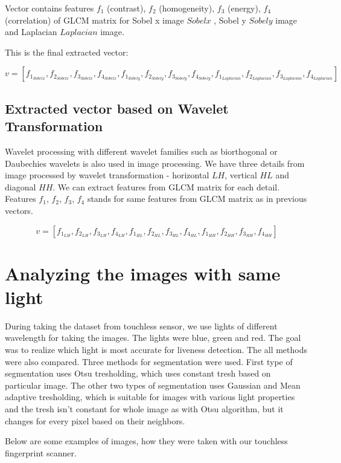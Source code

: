\documentclass{article}
\begin{document}
Vector contains features $f_1$ (contrast), $f_2$ (homogeneity), $f_3$ (energy), $f_4$ (correlation) of GLCM matrix for Sobel x image $Sobelx$ , Sobel y $Sobely$ image and Laplacian $Laplacian$ image.

This is the final extracted vector:

$$v = [f_1_{Sobelx}, f_2_{Sobelx}, f_3_{Sobelx}, f_4_{Sobelx}, f_1_{Sobely}, f_2_{Sobely}, f_3_{Sobely}, f_4_{Sobely}, f_1_{Laplacian}, f_2_{Laplacian}, f_3_{Laplacian}, f_4_{Laplacian}]$$

\subsection{Extracted vector based on Wavelet Transformation}
Wavelet processing with different wavelet families such as biorthogonal or Daubechies wavelets is also used in image processing. We have three details from image processed by wavelet transformation - horizontal $LH$, vertical $HL$ and diagonal $HH$. We can extract features from GLCM matrix for each detail. Features $f_1$, $f_2$, $f_3$, $f_4$ stands for same features from GLCM matrix as in previous vectors.

$$v = [f_1_{LH}, f_2_{LH}, f_3_{LH}, f_4_{LH}, f_1_{HL}, f_2_{HL}, f_3_{HL}, f_4_{HL}, f_1_{HH}, f_2_{HH}, f_3_{HH}, f_4_{HH}]$$

\section{Analyzing the images with same light }
During taking the dataset from touchless sensor, we use lights of different wavelength for taking the images. The lights were blue, green and red. The goal was to realize which light is most accurate for liveness detection. The all methods were also compared. Three methods for segmentation were used. First type of segmentation uses Otsu tresholding, which uses constant tresh based on particular image. The other two types of segmentation uses Gaussian and Mean adaptive tresholding, which is suitable for images with various light properties and the tresh isn't constant for whole image as with Otsu algorithm, but it changes for every pixel based on their neighbors.  

Below are some examples of images, how they were taken with our touchless fingerprint scanner.
\end{document}
